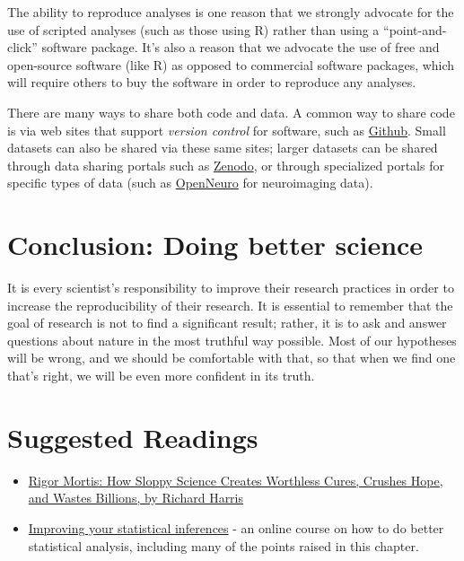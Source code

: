 \documentclass[]{book}
\providecommand{\tightlist}{%
  \setlength{\itemsep}{0pt}\setlength{\parskip}{0pt}}
\theoremstyle{definition}
\theoremstyle{definition}
\theoremstyle{definition}
\theoremstyle{remark}
\begin{document}
The ability to reproduce analyses is one reason that we strongly
advocate for the use of scripted analyses (such as those using R) rather
than using a ``point-and-click'' software package. It's also a reason
that we advocate the use of free and open-source software (like R) as
opposed to commercial software packages, which will require others to
buy the software in order to reproduce any analyses.

There are many ways to share both code and data. A common way to share
code is via web sites that support \emph{version control} for software,
such as \href{http://github.com}{Github}. Small datasets can also be
shared via these same sites; larger datasets can be shared through data
sharing portals such as \href{https://zenodo.org/}{Zenodo}, or through
specialized portals for specific types of data (such as
\href{http://openneuro.org}{OpenNeuro} for neuroimaging data).

\section{Conclusion: Doing better
science}\label{conclusion-doing-better-science}

It is every scientist's responsibility to improve their research
practices in order to increase the reproducibility of their research. It
is essential to remember that the goal of research is not to find a
significant result; rather, it is to ask and answer questions about
nature in the most truthful way possible. Most of our hypotheses will be
wrong, and we should be comfortable with that, so that when we find one
that's right, we will be even more confident in its truth.

\section{Suggested Readings}\label{suggested-readings-11}

\begin{itemize}
\tightlist
\item
  \href{https://www.amazon.com/dp/B01K3WN72C}{Rigor Mortis: How Sloppy
  Science Creates Worthless Cures, Crushes Hope, and Wastes Billions, by
  Richard Harris}
\item
  \href{https://www.coursera.org/learn/statistical-inferences}{Improving
  your statistical inferences} - an online course on how to do better
  statistical analysis, including many of the points raised in this
  chapter.
\end{itemize}
\end{document}
